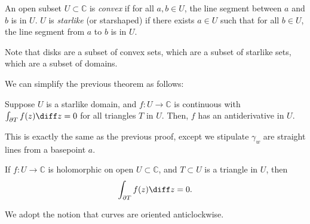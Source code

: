 \documentclass[12pt]{article}
\begin{document}
\begin{definition}
	An open subset $U \subset \mathbb{C}$ is \emph{convex} if for all $a, b \in U$, the line segment between $a$ and $b$ is in $U$. $U$ is \emph{starlike} (or starshaped) if there exists $a \in U$ such that for all $b \in U$, the line segment from $a$ to $b$ is in $U$.
\end{definition}

Note that disks are a subset of convex sets, which are a subset of starlike sets, which are a subset of domains.

We can simplify the previous theorem as follows:

\begin{lemma}
	Suppose $U$ is a starlike domain, and $f : U \to \mathbb{C}$ is continuous with $\int_{\partial T} f(z) \diff z = 0$ for all triangles $T$ in $U$. Then, $f$ has an antiderivative in $U$.
\end{lemma}

\begin{proofbox}
	This is exactly the same as the previous proof, except we stipulate $\gamma_w$ are straight lines from a basepoint $a$.
\end{proofbox}

\begin{theorem}
	If $f : U \to \mathbb{C}$ is holomorphic on open $U \subset \mathbb{C}$, and $T \subset U$ is a triangle in $U$, then
	\[
	\int_{\partial T}f(z) \diff z = 0
	.\]
\end{theorem}

We adopt the notion that curves are oriented anticlockwise.
\end{document}
